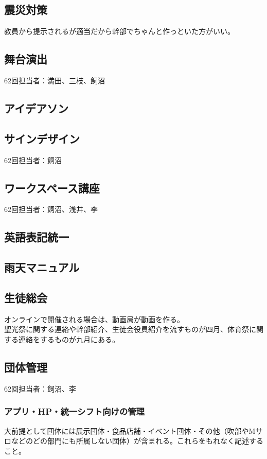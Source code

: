 \documentclass[dvipdfmx,jb5]{jarticle}
\begin{document}
 \subsection{震災対策}
 教員から提示されるが適当だから幹部でちゃんと作っといた方がいい。

 \subsection{舞台演出}
62回担当者：満田、三枝、飼沼

 \subsection{アイデアソン}

 \subsection{サインデザイン}
62回担当者：飼沼

 \subsection{ワークスペース講座}
62回担当者：飼沼、浅井、李

 \subsection{英語表記統一}

 \subsection{雨天マニュアル}

 \subsection{生徒総会}
 オンラインで開催される場合は、動画局が動画を作る。\\
 聖光祭に関する連絡や幹部紹介、生徒会役員紹介を流すものが四月、体育祭に関する連絡をするものが九月にある。\\


 \subsection{団体管理}
 62回担当者：飼沼、李
  \subsubsection{アプリ・HP・統一シフト向けの管理}
 大前提として団体には展示団体・食品店舗・イベント団体・その他（吹部やMサロなどのどの部門にも所属しない団体）が含まれる。これらをもれなく記述すること。
\end{document}
